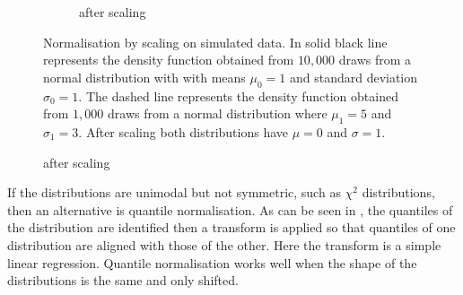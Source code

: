\begin{figure}[h]
\begin{subfigure}[b]{.5\textwidth}
\caption{after scaling}
\end{subfigure}
{Normalisation by scaling on simulated data.}
{
In solid black line represents the density function obtained from $10,000$ draws from a normal distribution
with with means $\mu_0=1$ and standard deviation $\sigma_0=1$.
The dashed line represents the density function obtained from $1,000$ draws from a normal distribution
where $\mu_1=5$ and $\sigma_1=3$.
After scaling both distributions have $\mu=0$ and $\sigma=1$.
}
\end{figure}

If the distributions are unimodal but not symmetric, such as $\chi^2$ distributions, then an alternative is quantile normalisation.
As can be seen in , the quantiles of the distribution are identified
then a transform is applied so that quantiles of one distribution are aligned with those of the other.
Here the transform is a simple linear regression.
Quantile normalisation works well when the shape of the distributions is the same and only shifted.  

